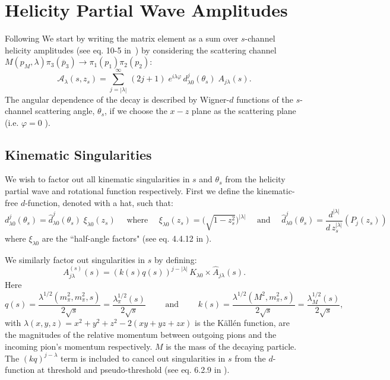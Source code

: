 \documentclass[10pt, aps,prd,amsmath,amssymb,superscriptaddress,onecolumn,
nofootinbib,showpacs,preprintnumbers]{revtex4-1}
\begin{document}
\section{Helicity Partial Wave Amplitudes} \label{sec:helicity}
Following \cite{Mikhasenko:2017rkh} We start by writing the matrix element as a sum over \(s\)-channel helicity amplitudes (see eq. 10-5 in~\cite{perl}) by considering the scattering channel \(M(p_M, \lambda) \pi_3(\overline{p}_3) \to  \pi_1(p_1)\pi_2(p_2)\):
  \begin{equation}
    \label{eq:helicity}
    \mathcal{A}_\lambda(s,z_s) = \sum_{j= |\lambda|}^\infty \, (2j +1) \; e^{i\lambda\varphi} \, d_{\lambda0}^j(\theta_s) \; A_{j \lambda}(s).
  \end{equation}
The angular dependence of the decay is described by Wigner-\(d\) functions of the \(s\)-channel scattering angle, \(\theta_s\), if we choose the \(x-z\) plane as the scattering plane (i.e. \(\varphi = 0 \) ).
\subsection{Kinematic Singularities}
\label{sec:kin-singularities}
We wish to factor out all kinematic singularities in \(s\) and \(\theta_s\) from the helicity partial wave and rotational function respectively. First we define the kinematic-free \(d\)-function, denoted with a hat, such that:
  \begin{equation}
      \label{eq:halfangle}
      d^j_{\lambda 0}(\theta_s) = \hat{d}^j_{\lambda 0}(\theta_s) \; \xi_{\lambda 0}(z_s)
       \quad \text{ where } \quad
      \xi_{\lambda 0}(z_s) = \bigg( \sqrt{ 1- z_s^2} \bigg)^{|\lambda|}
       \quad \text{ and } \quad
      \hat{d}^j_{\lambda 0}(\theta_s) = \frac{d^{|\lambda|}}{d \, z_s^{|\lambda|}} (P_j(z_s))
  \end{equation}
where \(\xi_{\lambda 0}\) are the ``half-angle factors" (see eq. 4.4.12 in \cite{Collins}).

We similarly factor out singularities in \(s\) by defining:
  \begin{equation}
    \label{eq:kinematicfreepartialwave}
    A^{(s)}_{j\lambda}(s) =   (k(s)q(s))^{j - |\lambda|} \, K_{\lambda 0} \times \hat{A}_{j\lambda}(s).
  \end{equation}
Here
  \begin{equation}
    \label{eq:momenta}
    q(s) = \frac{\lambda^{1/2}(m_\pi^2, m_\pi^2, s)}{2\sqrt{s}} = \frac{\lambda_\pi^{1/2}(s)}{2\sqrt{s}}
     \qquad \text{ and } \qquad
     k(s) = \frac{\lambda^{1/2}(M^2, m_\pi^2, s)}{2\sqrt{s}} = \frac{\lambda_M^{1/2}(s)}{2\sqrt{s}} ,
  \end{equation}
with \(\lambda(x,y,z) = x^2 + y^2 + z^2 - 2 (xy + yz + zx)\) is the K\"{a}ll\'{e}n function, are the magnitudes of  the relative momentum between outgoing pions and the incoming pion's momentum respectively. \(M\) is the mass of the decaying particle. The \((kq)^{j-\lambda}\) term is included to cancel out singularities in \(s\) from the \(d\)-function at threshold and pseudo-threshold (see eq. 6.2.9 in \cite{Collins}).
\end{document}
